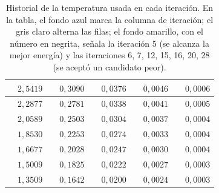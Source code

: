 \begin{table}[H]
\begin{tabular}{|c|c|c|c|c|c|c|c|c|c|}
\hline
\cellcolor{iteracion}{\bfseries\boldmath $14$} & \cellcolor{cebra}$2{,}5419$ & \cellcolor{iteracion}{\bfseries\boldmath $34$} & \cellcolor{cebra}$0{,}3090$ & \cellcolor{iteracion}{\bfseries\boldmath $54$} & \cellcolor{cebra}$0{,}0376$ & \cellcolor{iteracion}{\bfseries\boldmath $74$} & \cellcolor{cebra}$0{,}0046$ & \cellcolor{iteracion}{\bfseries\boldmath $94$} & \cellcolor{cebra}$0{,}0006$ \\
\hline
\cellcolor{destacado}{\bfseries\boldmath $15$} & \cellcolor{destacado}$2{,}2877$ & \cellcolor{iteracion}{\bfseries\boldmath $35$} & $0{,}2781$ & \cellcolor{iteracion}{\bfseries\boldmath $55$} & $0{,}0338$ & \cellcolor{iteracion}{\bfseries\boldmath $75$} & $0{,}0041$ & \cellcolor{iteracion}{\bfseries\boldmath $95$} & $0{,}0005$ \\
\hline
\cellcolor{destacado}{\bfseries\boldmath $16$} & \cellcolor{destacado}$2{,}0589$ & \cellcolor{iteracion}{\bfseries\boldmath $36$} & \cellcolor{cebra}$0{,}2503$ & \cellcolor{iteracion}{\bfseries\boldmath $56$} & \cellcolor{cebra}$0{,}0304$ & \cellcolor{iteracion}{\bfseries\boldmath $76$} & \cellcolor{cebra}$0{,}0037$ & \cellcolor{iteracion}{\bfseries\boldmath $96$} & \cellcolor{cebra}$0{,}0004$ \\
\hline
\cellcolor{iteracion}{\bfseries\boldmath $17$} & $1{,}8530$ & \cellcolor{iteracion}{\bfseries\boldmath $37$} & $0{,}2253$ & \cellcolor{iteracion}{\bfseries\boldmath $57$} & $0{,}0274$ & \cellcolor{iteracion}{\bfseries\boldmath $77$} & $0{,}0033$ & \cellcolor{iteracion}{\bfseries\boldmath $97$} & $0{,}0004$ \\
\hline
\cellcolor{iteracion}{\bfseries\boldmath $18$} & \cellcolor{cebra}$1{,}6677$ & \cellcolor{iteracion}{\bfseries\boldmath $38$} & \cellcolor{cebra}$0{,}2028$ & \cellcolor{iteracion}{\bfseries\boldmath $58$} & \cellcolor{cebra}$0{,}0247$ & \cellcolor{iteracion}{\bfseries\boldmath $78$} & \cellcolor{cebra}$0{,}0030$ & \cellcolor{iteracion}{\bfseries\boldmath $98$} & \cellcolor{cebra}$0{,}0004$ \\
\hline
\cellcolor{iteracion}{\bfseries\boldmath $19$} & $1{,}5009$ & \cellcolor{iteracion}{\bfseries\boldmath $39$} & $0{,}1825$ & \cellcolor{iteracion}{\bfseries\boldmath $59$} & $0{,}0222$ & \cellcolor{iteracion}{\bfseries\boldmath $79$} & $0{,}0027$ & \cellcolor{iteracion}{\bfseries\boldmath $99$} & $0{,}0003$ \\
\hline
\cellcolor{destacado}{\bfseries\boldmath $20$} & \cellcolor{destacado}$1{,}3509$ & \cellcolor{iteracion}{\bfseries\boldmath $40$} & \cellcolor{cebra}$0{,}1642$ & \cellcolor{iteracion}{\bfseries\boldmath $60$} & \cellcolor{cebra}$0{,}0200$ & \cellcolor{iteracion}{\bfseries\boldmath $80$} & \cellcolor{cebra}$0{,}0024$ & \cellcolor{iteracion}{\bfseries\boldmath $100$} & \cellcolor{cebra}$0{,}0003$ \\
\hline
\end{tabular}
\caption{Historial de la temperatura usada en cada iteración. En la tabla, el fondo azul marca la columna de iteración; el gris claro alterna las filas; el fondo amarillo, con el número en negrita, señala la iteración 5 (se alcanza la mejor energía) y las iteraciones 6, 7, 12, 15, 16, 20, 28 (se aceptó un candidato peor).}
\label{tab:p3b-temperatura}
\end{table}
